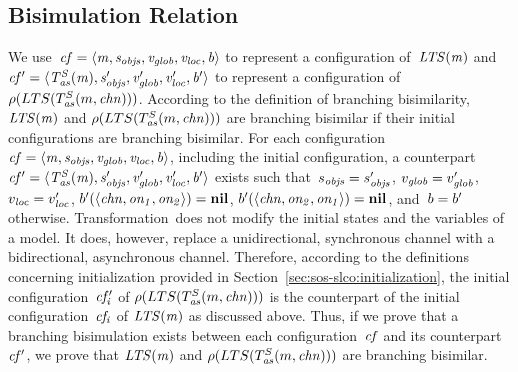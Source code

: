\subsection{Bisimulation Relation}
We use~$\it{cf} = \langle m, s_{\it{objs}}, v_{\it{glob}}, v_{\it{loc}}, b \rangle$ to represent a configuration of~$\it{LTS}(m)$ and~$\it{cf'} = \langle T^S_{\it{as}}(m), s_{\it{objs}}', v_{\it{glob}}', v_{\it{loc}}', b' \rangle$ to represent a configuration of~$\rho(LTS(T^S_{\it{as}}(m, \it{chn})))$.
According to the definition of branching bisimilarity, $\it{LTS}(m)$ and $\rho(LTS(T^S_{\it{as}}(m, \it{chn})))$ are branching bisimilar if their initial configurations are branching bisimilar.
For each configuration~$\it{cf} = \langle m, s_{\it{objs}}, v_{\it{glob}}, v_{\it{loc}}, b \rangle$, including the initial configuration, a counterpart~$\it{cf'} = \langle T^S_{\it{as}}(m), s_{\it{objs}}', v_{\it{glob}}', v_{\it{loc}}', b' \rangle$ exists such that~$s_{\it{objs}} = s_{\it{objs}}'$, $v_{\it{glob}} = v_{\it{glob}}'$, $v_{\it{loc}} = v_{\it{loc}}'$, $b'(\langle \it{chn}, \it{on_1}, \it{on_2} \rangle) = \mathbf{nil}$, $b'(\langle \it{chn}, \it{on_2}, \it{on_1} \rangle) = \mathbf{nil}$, and~$b = b'$ otherwise.
Transformation~\TSim does not modify the initial states and the variables of a model.
It does, however, replace a unidirectional, synchronous channel with a bidirectional, asynchronous channel.
Therefore, according to the definitions concerning initialization provided in Section~\ref{sec:sos-slco:initialization}, the initial configuration~$\it{cf'_i}$ of $\rho(LTS(T^S_{\it{as}}(m, \it{chn})))$ is the counterpart of the initial configuration~$\it{cf_i}$ of $\it{LTS}(m)$ as discussed above.
Thus, if we prove that a branching bisimulation exists between each configuration~$\it{cf}$ and its counterpart~$\it{cf'}$, we prove that $\it{LTS}(m)$ and $\rho(LTS(T^S_{\it{as}}(m, \it{chn})))$ are branching bisimilar.

